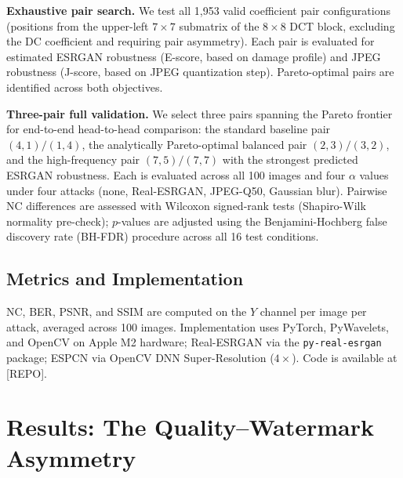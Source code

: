 \documentclass[conference]{IEEEtran}
\begin{document}
\textbf{Exhaustive pair search.} We test all 1,953 valid coefficient
pair configurations (positions from the upper-left $7\times7$ submatrix
of the $8\times8$ DCT block, excluding the DC coefficient and requiring
pair asymmetry). Each pair is evaluated for estimated ESRGAN robustness
(E-score, based on damage profile) and JPEG robustness (J-score, based
on JPEG quantization step). Pareto-optimal pairs are identified across
both objectives.

\textbf{Three-pair full validation.} We select three pairs spanning the
Pareto frontier for end-to-end head-to-head comparison: the standard
baseline pair $(4,1)/(1,4)$, the analytically Pareto-optimal balanced
pair $(2,3)/(3,2)$, and the high-frequency pair $(7,5)/(7,7)$ with the
strongest predicted ESRGAN robustness. Each is evaluated across all 100
images and four $\alpha$ values under four attacks (none, Real-ESRGAN,
JPEG-Q50, Gaussian blur). Pairwise NC differences are assessed with
Wilcoxon signed-rank tests (Shapiro-Wilk normality pre-check); $p$-values
are adjusted using the Benjamini-Hochberg false discovery rate (BH-FDR)
procedure across all 16 test conditions.

\subsection{Metrics and Implementation}
NC, BER, PSNR, and SSIM \cite{ssim2004} are computed on the $Y$ channel
per image per attack, averaged across 100 images. Implementation uses
PyTorch, PyWavelets, and OpenCV on Apple M2 hardware; Real-ESRGAN via
the \texttt{py-real-esrgan} package; ESPCN via OpenCV DNN
Super-Resolution ($4\times$). Code is available at [REPO].

\section{Results: The Quality--Watermark Asymmetry}
\label{sec:results}
\end{document}
